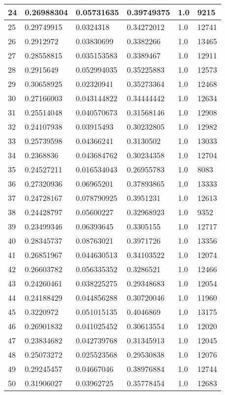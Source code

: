\begin{longtable}{|l|l|l|l|l|l|}
24 & 0.26988304 & 0.05731635 & 0.39749375 & 1.0 & 9215 \\ \hline 
25 & 0.29749915 & 0.0324318 & 0.34272012 & 1.0 & 12741 \\ \hline 
26 & 0.2912972 & 0.03830699 & 0.3382266 & 1.0 & 13465 \\ \hline 
27 & 0.28558815 & 0.035153583 & 0.3389467 & 1.0 & 12911 \\ \hline 
28 & 0.2915649 & 0.052994035 & 0.35225883 & 1.0 & 12573 \\ \hline 
29 & 0.30658925 & 0.02320941 & 0.35273364 & 1.0 & 12468 \\ \hline 
30 & 0.27166003 & 0.043144822 & 0.34444442 & 1.0 & 12634 \\ \hline 
31 & 0.25514048 & 0.040570673 & 0.31568146 & 1.0 & 12908 \\ \hline 
32 & 0.24107938 & 0.03915493 & 0.30232805 & 1.0 & 12982 \\ \hline 
33 & 0.25739598 & 0.04366241 & 0.3130502 & 1.0 & 13033 \\ \hline 
34 & 0.2368836 & 0.043684762 & 0.30234358 & 1.0 & 12704 \\ \hline 
35 & 0.24527211 & 0.016534043 & 0.26955783 & 1.0 & 8083 \\ \hline 
36 & 0.27320936 & 0.06965201 & 0.37893865 & 1.0 & 13333 \\ \hline 
37 & 0.24728167 & 0.078790925 & 0.3951231 & 1.0 & 12613 \\ \hline 
38 & 0.24428797 & 0.05600227 & 0.32968923 & 1.0 & 9352 \\ \hline 
39 & 0.23499346 & 0.06393645 & 0.3305155 & 1.0 & 12717 \\ \hline 
40 & 0.28345737 & 0.08763021 & 0.3971726 & 1.0 & 13356 \\ \hline 
41 & 0.26851967 & 0.044630513 & 0.34103522 & 1.0 & 12074 \\ \hline 
42 & 0.26603782 & 0.056335352 & 0.3286521 & 1.0 & 12466 \\ \hline 
43 & 0.24260461 & 0.038225275 & 0.29348683 & 1.0 & 12054 \\ \hline 
44 & 0.24188429 & 0.044856288 & 0.30720046 & 1.0 & 11960 \\ \hline 
45 & 0.3220972 & 0.051015135 & 0.4046869 & 1.0 & 13175 \\ \hline 
46 & 0.26901832 & 0.041025452 & 0.30613554 & 1.0 & 12020 \\ \hline 
47 & 0.23834682 & 0.042739768 & 0.31345913 & 1.0 & 12045 \\ \hline 
48 & 0.25073272 & 0.025523568 & 0.29530838 & 1.0 & 12076 \\ \hline 
49 & 0.29245457 & 0.04667046 & 0.38976884 & 1.0 & 12744 \\ \hline 
50 & 0.31906027 & 0.03962725 & 0.35778454 & 1.0 & 12683 \\ \hline 
\end{longtable}